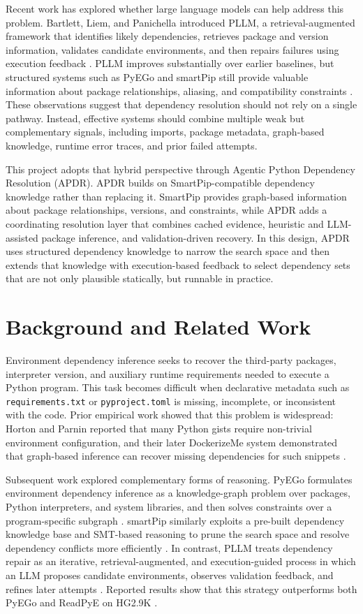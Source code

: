 \documentclass[conference]{IEEEtran}
\begin{document}
Recent work has explored whether large language models can help address this problem. Bartlett, Liem, and Panichella introduced PLLM, a retrieval-augmented framework that identifies likely dependencies, retrieves package and version information, validates candidate environments, and then repairs failures using execution feedback \cite{b5}. PLLM improves substantially over earlier baselines, but structured systems such as PyEGo and smartPip still provide valuable information about package relationships, aliasing, and compatibility constraints \cite{b3,b4}. These observations suggest that dependency resolution should not rely on a single pathway. Instead, effective systems should combine multiple weak but complementary signals, including imports, package metadata, graph-based knowledge, runtime error traces, and prior failed attempts.

This project adopts that hybrid perspective through Agentic Python Dependency Resolution (APDR). APDR builds on SmartPip-compatible dependency knowledge rather than replacing it. SmartPip provides graph-based information about package relationships, versions, and constraints, while APDR adds a coordinating resolution layer that combines cached evidence, heuristic and LLM-assisted package inference, and validation-driven recovery. In this design, APDR uses structured dependency knowledge to narrow the search space and then extends that knowledge with execution-based feedback to select dependency sets that are not only plausible statically, but runnable in practice.

\section{Background and Related Work}
Environment dependency inference seeks to recover the third-party packages, interpreter version, and auxiliary runtime requirements needed to execute a Python program. This task becomes difficult when declarative metadata such as \texttt{requirements.txt} or \texttt{pyproject.toml} is missing, incomplete, or inconsistent with the code. Prior empirical work showed that this problem is widespread: Horton and Parnin reported that many Python gists require non-trivial environment configuration, and their later DockerizeMe system demonstrated that graph-based inference can recover missing dependencies for such snippets \cite{b1,b2}.

Subsequent work explored complementary forms of reasoning. PyEGo formulates environment dependency inference as a knowledge-graph problem over packages, Python interpreters, and system libraries, and then solves constraints over a program-specific subgraph \cite{b3}. smartPip similarly exploits a pre-built dependency knowledge base and SMT-based reasoning to prune the search space and resolve dependency conflicts more efficiently \cite{b4}. In contrast, PLLM treats dependency repair as an iterative, retrieval-augmented, and execution-guided process in which an LLM proposes candidate environments, observes validation feedback, and refines later attempts \cite{b5}. Reported results show that this strategy outperforms both PyEGo and ReadPyE on HG2.9K \cite{b5}.
\end{document}
